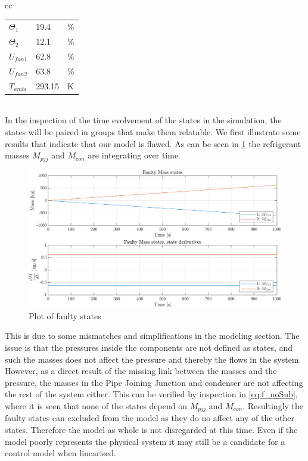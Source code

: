 \begin{tabular}{cc}
\begin{minipage}{.3\linewidth}
\begin{tabular}{@{}lll@{}}
			$\Theta_1$      & 19.4                                                               & \%            \\
			$\Theta_2$      & 12.1                                                               & \%            \\
			$U_{fan1}$      & 62.8                                                               & \%            \\
			$U_{fan2}$      & 63.8                                                               & \%            \\
			$T_{ambi}$        & 293.15                                                             & K             \\ \bottomrule
		\end{tabular}
	\end{minipage}
\end{tabular}\\


In the inspection of the time evolvement of the states in the simulation, the states will be paired in groups that make them relatable. We first illustrate some results that indicate that our model is flawed. As can be seen in \cref{fig:non_lin_sim_faulty_Mass} the refrigerant masses $M_{pjj}$ and $M_{con}$ are integrating over time.

\begin{figure}[h]
	\centering
	\includegraphics[width=1\textwidth]{Graphics/nonlin_sim_faulty_Mass.png}
	\caption{Plot of faulty states}
	\label{fig:non_lin_sim_faulty_Mass}
\end{figure}
This is due to some mismatches and simplifications in the modeling section. The issue is that the pressures inside the components are not defined as states, and such the masses does not affect the pressure and thereby the flows in the system. However, as a direct result of the missing link between the masses and the pressure, the masses in the Pipe Joining Junction and condenser are not affecting the rest of the system either. This can be verified by inspection in \cref{eq:f_noSub}, where it is seen that none of the states depend on $M_{pjj}$ and $M_{con}$. Resultingly the faulty states can excluded from the model as they do no affect any of the other states. Therefore the model as whole is not disregarded at this time. Even if the model poorly represents the physical system it may still be a candidate for a control model when linearised. \\

